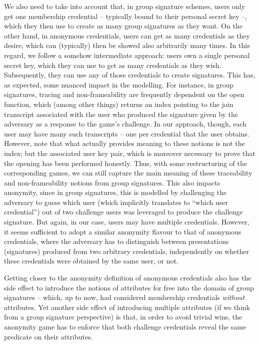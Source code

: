 We also need to take into account that, in group signature schemes, users only
get one membership credential -- typically bound to their personal secret
key --, which they then use to create as many group signatures as they want. On
the other hand, in anonymous credentials, users can get as many credentials as
they desire, which can (typically) then be showed also arbitrarily many times.
In this regard, we follow a somehow intermediate approach: users own a single
personal secret key, which they can use to get as many credentials as they wish.
Subsequently, they can use any of those credentials to create \GSAC signatures.
This has, as expected, some nuanced impact in the modelling. For instance, in
group signatures, tracing and non-frameability are frequently dependent on the
open function, which (among other things) returns an index pointing to the join
transcript associated with the user who produced the signature given by the
adversary as a response to the game's challenge. In our approach, though, each
user may have many such transcripts -- one per credential that the user
obtains. However, note that what actually provides meaning to these notions
is not the index; but the associated user key pair, which is moreover necessary
to prove that the opening has been performed honestly. Thus, with some
restructuring of the corresponding games, we can still capture the main
meaning of these traceability and non-frameability notions from group
signatures. This also impacts anonymity, since in group signatures, this is
modelled by challenging the adversary to guess which user (which implicitly
translates to ``which user credential'') out of two challenge users was
leveraged to produce the challenge signature. But again, in our case, users may
have multiple credentials. However, it seems sufficient to adopt a similar
anonymity flavour to that of anonymous credentials, where the adversary has to
distinguish between presentations (signatures) produced from two arbitrary
credentials, independently on whether these credentials were obtained by the
same user, or not.

Getting closer to the anonymity definition of anonymous credentials also has the
side effect to introduce the notions of attributes for free into the domain of
group signatures -- which, up to now, had considered membership credentials
\emph{without} attributes. Yet another side effect of introducing multiple
attributes (if we think from a group signature perspective) is that, in order
to avoid trivial wins, the anonymity game has to enforce that both challenge
credentials reveal the same predicate on their attributes.

